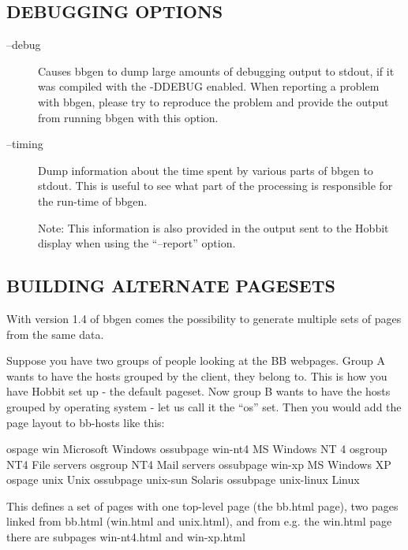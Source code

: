 \subsection{DEBUGGING OPTIONS}


 \begin{description}
\item[--debug] Causes bbgen to dump large amounts of debugging output
  to stdout, if it was compiled with the -DDEBUG enabled. When
  reporting a problem with bbgen, please try to reproduce the problem
  and provide the output from running bbgen with this option. 


 

\item[--timing] Dump information about the time spent by various parts
  of bbgen to stdout. This is useful to see what part of the
  processing is responsible for the run-time of bbgen.  

 Note: This information is also provided in the output sent to the Hobbit display when using the ``--report'' option. 

 


 


\end{description}

\subsection{BUILDING ALTERNATE PAGESETS}
 With version 1.4 of bbgen comes the possibility to generate multiple
 sets of pages from the same data.  

 Suppose you have two groups of people looking at the BB
 webpages. Group A wants to have the hosts grouped by the client, they
 belong to. This is how you have Hobbit set up - the default
 pageset. Now group B wants to have the hosts grouped by operating
 system - let us call it the ``os'' set. Then you would add the page
 layout to bb-hosts like this: 


 ospage win Microsoft Windows  
 ossubpage win-nt4 MS Windows NT 4  
 osgroup NT4 File servers  
 osgroup NT4 Mail servers  
 ossubpage win-xp MS Windows XP  
 ospage unix Unix  
 ossubpage unix-sun Solaris  
 ossubpage unix-linux Linux 


  This defines a set of pages with one top-level page (the bb.html
  page), two pages linked from bb.html (win.html and unix.html), and
  from e.g. the win.html page there are subpages win-nt4.html and
  win-xp.html  

